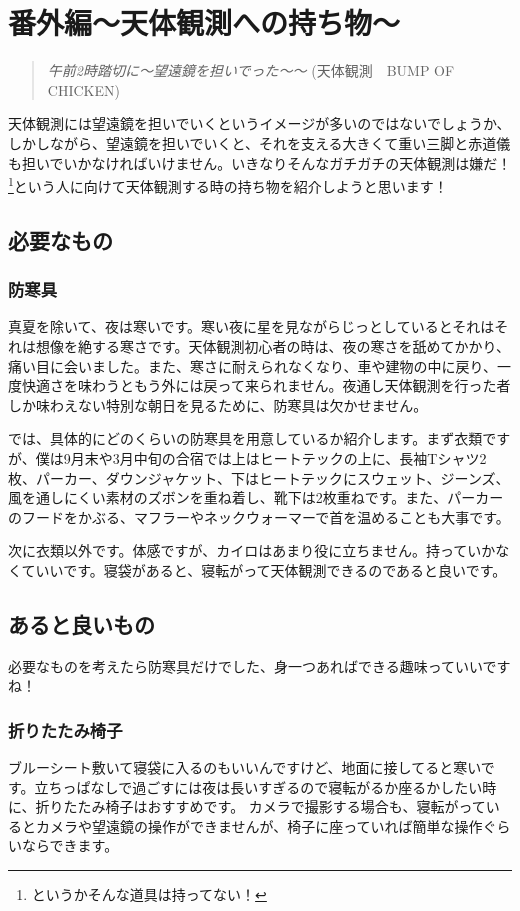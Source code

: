 \documentclass[../../super_nova_2024]{subfiles}
\begin{document}
\chapter{番外編〜天体観測への持ち物〜}

\begin{verse}
  {\slshape
  午前2時踏切に〜望遠鏡を担いでった〜〜
  }
  {\footnotesize(天体観測　BUMP OF CHICKEN)}
\end{verse}



天体観測には望遠鏡を担いでいくというイメージが多いのではないでしょうか、しかしながら、望遠鏡を担いでいくと、それを支える大きくて重い三脚と赤道儀も担いでいかなければいけません。いきなりそんなガチガチの天体観測は嫌だ！\footnote{というかそんな道具は持ってない！}という人に向けて天体観測する時の持ち物を紹介しようと思います！

\section{必要なもの}
\subsection{防寒具}
真夏を除いて、夜は寒いです。寒い夜に星を見ながらじっとしているとそれはそれは想像を絶する寒さです。天体観測初心者の時は、夜の寒さを舐めてかかり、痛い目に会いました。また、寒さに耐えられなくなり、車や建物の中に戻り、一度快適さを味わうともう外には戻って来られません。夜通し天体観測を行った者しか味わえない特別な朝日を見るために、防寒具は欠かせません。

では、具体的にどのくらいの防寒具を用意しているか紹介します。まず衣類ですが、僕は9月末や3月中旬の合宿では上はヒートテックの上に、長袖Tシャツ2枚、パーカー、ダウンジャケット、下はヒートテックにスウェット、ジーンズ、風を通しにくい素材のズボンを重ね着し、靴下は2枚重ねです。また、パーカーのフードをかぶる、マフラーやネックウォーマーで首を温めることも大事です。

次に衣類以外です。体感ですが、カイロはあまり役に立ちません。持っていかなくていいです。寝袋があると、寝転がって天体観測できるのであると良いです。

\section{あると良いもの}
必要なものを考えたら防寒具だけでした、身一つあればできる趣味っていいですね！

\subsection{折りたたみ椅子}
ブルーシート敷いて寝袋に入るのもいいんですけど、地面に接してると寒いです。立ちっぱなしで過ごすには夜は長いすぎるので寝転がるか座るかしたい時に、折りたたみ椅子はおすすめです。
カメラで撮影する場合も、寝転がっているとカメラや望遠鏡の操作ができませんが、椅子に座っていれば簡単な操作ぐらいならできます。
\end{document}
